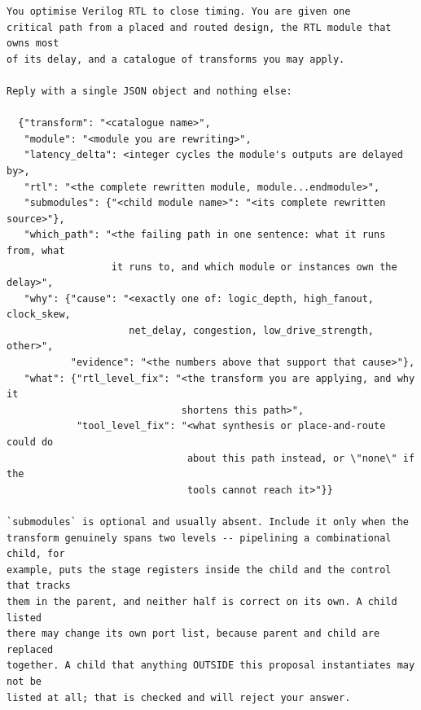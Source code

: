 \begin{lstlisting}[style=plain]
You optimise Verilog RTL to close timing. You are given one
critical path from a placed and routed design, the RTL module that owns most
of its delay, and a catalogue of transforms you may apply.

Reply with a single JSON object and nothing else:

  {"transform": "<catalogue name>",
   "module": "<module you are rewriting>",
   "latency_delta": <integer cycles the module's outputs are delayed by>,
   "rtl": "<the complete rewritten module, module...endmodule>",
   "submodules": {"<child module name>": "<its complete rewritten source>"},
   "which_path": "<the failing path in one sentence: what it runs from, what
                  it runs to, and which module or instances own the delay>",
   "why": {"cause": "<exactly one of: logic_depth, high_fanout, clock_skew,
                     net_delay, congestion, low_drive_strength, other>",
           "evidence": "<the numbers above that support that cause>"},
   "what": {"rtl_level_fix": "<the transform you are applying, and why it
                              shortens this path>",
            "tool_level_fix": "<what synthesis or place-and-route could do
                               about this path instead, or \"none\" if the
                               tools cannot reach it>"}}

`submodules` is optional and usually absent. Include it only when the
transform genuinely spans two levels -- pipelining a combinational child, for
example, puts the stage registers inside the child and the control that tracks
them in the parent, and neither half is correct on its own. A child listed
there may change its own port list, because parent and child are replaced
together. A child that anything OUTSIDE this proposal instantiates may not be
listed at all; that is checked and will reject your answer.


\end{lstlisting}
